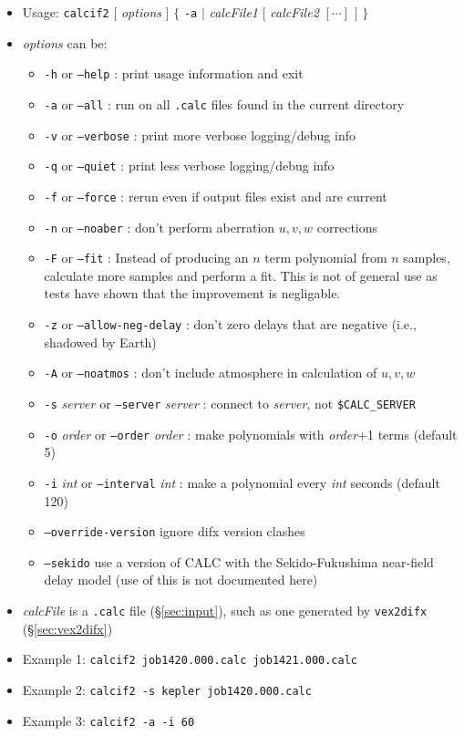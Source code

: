 \begin{itemize}
\item[] Usage: {\tt calcif2} $[$ {\em options} $]$ $\{$ {\tt -a} $\mid$ {\em calcFile1} $[$ {\em calcFile2} $[\cdots]$ $]$ $\}$
\item[] {\em options} can be:
\begin{itemize}
\item[] {\tt -h} or {\tt --help} : print usage information and exit
\item[] {\tt -a} or {\tt --all} : run on all {\tt .calc} files found in the current directory
\item[] {\tt -v} or {\tt --verbose} : print more verbose logging/debug info
\item[] {\tt -q} or {\tt --quiet} : print less verbose logging/debug info
\item[] {\tt -f} or {\tt --force} : rerun even if output files exist and are current
\item[] {\tt -n} or {\tt --noaber} : don't perform aberration $u,v,w$ corrections
\item[] {\tt -F} or {\tt --fit} : Instead of producing an $n$ term polynomial from $n$ samples, calculate more samples and perform a fit.  This is not of general use as tests have shown that the improvement is negligable.
\item[] {\tt -z} or {\tt --allow-neg-delay} : don't zero delays that are negative (i.e., shadowed by Earth)
\item[] {\tt -A} or {\tt --noatmos} : don't include atmosphere in calculation of $u,v,w$
\item[] {\tt -s} {\em server} or {\tt --server} {\em server} : connect to {\em server}, not {\tt \$CALC\_SERVER}
\item[] {\tt -o} {\em order} or {\tt --order} {\em order} : make polynomials with {\em order}+1 terms (default 5)  
\item[] {\tt -i} {\em int} or {\tt --interval} {\em int} : make a polynomial every {\em int} seconds (default 120)
\item[] {\tt --override-version} ignore difx version clashes
\item[] {\tt --sekido} use a version of CALC with the Sekido-Fukushima near-field delay model (use of this is not documented here)
\end{itemize}
\item[] {\em calcFile} is a {\tt .calc} file (\S\ref{sec:input}), such as one generated by {\tt vex2difx} (\S\ref{sec:vex2difx})
\item[] Example 1: {\tt calcif2 job1420.000.calc job1421.000.calc} 
\item[] Example 2: {\tt calcif2 -s kepler job1420.000.calc}
\item[] Example 3: {\tt calcif2 -a -i 60} 
\end{itemize}

